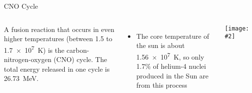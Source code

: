\documentclass[12pt,compress,aspectratio=169]{beamer}
\newcommand{\pic}[2]{\texttt{[image: \#2]}}
\begin{document}
\begin{frame}{CNO Cycle}
  \begin{columns}
    A fusion reaction that occurs in even higher temperatures (between 1.5 to
    \SI{1.7e7}{\kelvin}) is the carbon-nitrogen-oxygen (CNO) cycle. The total
    energy released in one cycle is \SI{26.73}{\mega\electronvolt}.
    \begin{itemize}
    \item The core temperature of the sun is about \SI{1.56e7}{\kelvin}, so
      only 1.7\% of helium-4 nuclei produced in the Sun are from this process
    \end{itemize}
    \pic{1.1}{graphics/CNO-Cycle}
  \end{columns}
\end{frame}
\end{document}
